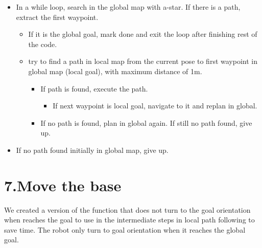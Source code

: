 \documentclass{article}
\begin{document}
\begin{itemize}[noitemsep,topsep=\mdcompacttopsep]%

\item{}In a while loop, search in the global map with a-star. If there is a path, extract the first waypoint.

\begin{itemize}[noitemsep,topsep=\mdcompacttopsep]%

\item{}If it is the global goal, mark done and exit the loop after finishing rest of the code.%

\item{}try to find a path in local map from the current pose to first waypoint in global map (local goal), with maximum distance of 1m. 

\begin{itemize}[noitemsep,topsep=\mdcompacttopsep]%

\item{}If path is found, execute the path. 

\begin{itemize}[noitemsep,topsep=\mdcompacttopsep]%

\item{}If next waypoint is local goal, navigate to it and replan in global.%
\end{itemize}%

\item{}If no path is found, plan in global again. If still no path found, give up.%
\end{itemize}%
\end{itemize}%

\item{}If no path found initially in global map, give up.%
\end{itemize}%

\section{7.\hspace*{0.5em}Move the base}\label{sec-move-the-base}%

\noindent{}We created a version of the  function that does not turn to the goal orientation when reaches the goal to use in the intermediate steps in local path following to save time. The robot only turn to goal orientation when it reaches the global goal.%
\end{document}
